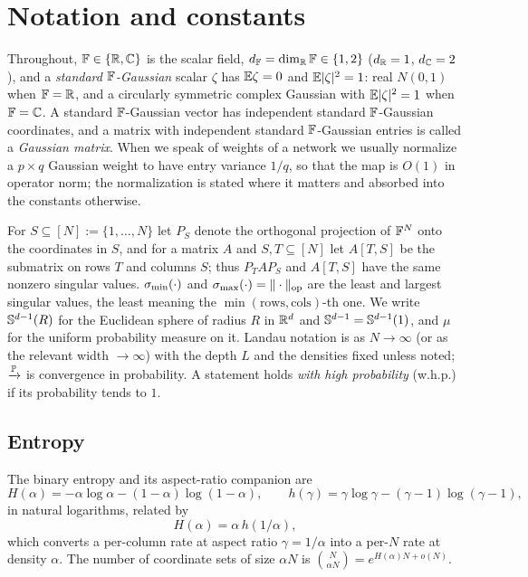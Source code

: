 \section{Notation and constants}\label{sec:notation}

Throughout, $\mathbb{F}\in\{\mathbb{R},\mathbb{C}\}$ is the scalar field, $d_{\mathbb{F}}=\dim_{\mathbb{R}}\mathbb{F}\in\{1,2\}$ ($d_{\mathbb{R}}=1$, $d_{\mathbb{C}}=2$),
and a \emph{standard $\mathbb{F}$-Gaussian} scalar $\zeta$ has $\mathbb{E}\zeta=0$ and $\mathbb{E}|\zeta|^2=1$: real
$N(0,1)$ when $\mathbb{F}=\mathbb{R}$, and a circularly symmetric complex Gaussian with $\mathbb{E}|\zeta|^2=1$ when
$\mathbb{F}=\mathbb{C}$. A standard $\mathbb{F}$-Gaussian vector has independent standard $\mathbb{F}$-Gaussian coordinates, and a
matrix with independent standard $\mathbb{F}$-Gaussian entries is called a \emph{Gaussian matrix}. When we
speak of weights of a network we usually normalize a $p\times q$ Gaussian weight to have entry
variance $1/q$, so that the map is $O(1)$ in operator norm; the normalization is stated where it
matters and absorbed into the constants otherwise.

For $S\subseteq[N]:=\{1,\dots,N\}$ let $P_S$ denote the orthogonal projection of $\mathbb{F}^N$ onto the
coordinates in $S$, and for a matrix $A$ and $S,T\subseteq[N]$ let $A[T,S]$ be the submatrix on rows
$T$ and columns $S$; thus $P_TAP_S$ and $A[T,S]$ have the same nonzero singular values.
$\sigma_{\min}(\cdot)$ and $\sigma_{\max}(\cdot)=\|\cdot\|_{\mathrm{op}}$ are the least and largest singular values, the least
meaning the $\min(\text{rows},\text{cols})$-th one. We write $\mathbb{S}^{d-1}(R)$ for the Euclidean sphere
of radius $R$ in $\mathbb{R}^d$ and $\mathbb{S}^{d-1}=\mathbb{S}^{d-1}(1)$, and $\mu$ for the uniform probability measure
on it. Landau notation is as $N\to\infty$ (or as the relevant width $\to\infty$) with the depth
$L$ and the densities fixed unless noted; $\xrightarrow{\mathbb{P}}$ is convergence in probability. A
statement holds \emph{with high probability} (w.h.p.) if its probability tends to $1$.

\subsection{Entropy}
The binary entropy and its aspect-ratio companion are
\[
  H(\alpha)=-\alpha\log\alpha-(1-\alpha)\log(1-\alpha),\qquad
  h(\gamma)=\gamma\log\gamma-(\gamma-1)\log(\gamma-1),
\]
in natural logarithms, related by
\begin{equation}\label{eq:Hident}
  H(\alpha)=\alpha\,h(1/\alpha),
\end{equation}
which converts a per-column rate at aspect ratio $\gamma=1/\alpha$ into a per-$N$ rate at density
$\alpha$. The number of coordinate sets of size $\alpha N$ is $\binom N{\alpha N}=e^{H(\alpha)N+o(N)}$.

